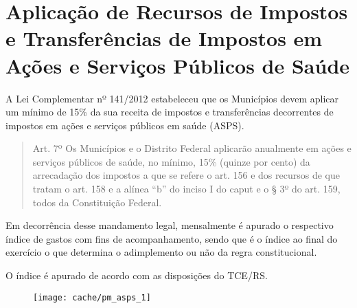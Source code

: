 
\section[Aplicação de Recursos em ASPS]{Aplicação de Recursos de Impostos e Transferências de Impostos em Ações e Serviços Públicos de Saúde}

A Lei Complementar nº 141/2012 estabeleceu que os Municípios devem aplicar um mínimo de 15\% da sua receita de impostos e transferências decorrentes de impostos em ações e serviços públicos em saúde (ASPS).

\begin{quotation}
Art. 7º Os Municípios e o Distrito Federal aplicarão anualmente em ações e serviços públicos de saúde, no mínimo, 15\% (quinze por cento) da arrecadação dos impostos a que se refere o art. 156 e dos recursos de que tratam o art. 158 e a alínea “b” do inciso I do caput e o § 3º do art. 159, todos da Constituição Federal.
\end{quotation}

Em decorrência desse mandamento legal, mensalmente é apurado o respectivo índice de gastos com fins de acompanhamento, sendo que é o índice ao final do exercício o que determina o adimplemento ou não da regra constitucional.



O índice é apurado de acordo com as disposições do TCE/RS.

\begin{figure}[H]
\center
\texttt{[image: cache/pm\_asps\_1]}
\end{figure}

